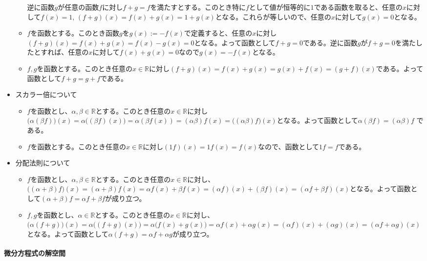 \begin{itemize}
\begin{itemize}
逆に函数$g$が任意の函数$f$に対し$f + g = f$を満たすとする。このとき特に$f$として値が恒等的に$1$である函数を取ると、任意の$x$に対して$f(x) = 1$, $(f + g)(x) = f(x) + g(x) = 1 + g(x)$となる。これらが等しいので、任意の$x$に対して$g(x) = 0$となる。
\item $f$を函数とする。このとき函数$g$を$g(x) := -f(x)$で定義すると、任意の$x$に対し$(f + g)(x) = f(x) + g(x) = f(x) - g(x) =0$となる。よって函数として$f + g = 0$である。逆に函数$g$が$f + g = 0$を満たしたとすれば、任意の$x$に対して$f(x) + g(x) = 0$なので$g(x) = -f(x)$となる。
\item $f, g$を函数とする。このとき任意の$x\in\mathbb{R}$に対し$(f + g)(x) = f(x) + g(x) = g(x) + f(x) = (g + f)(x)$である。よって函数として$f + g = g + f$である。
\end{itemize}
\item スカラー倍について
\begin{itemize}
\item $f$を函数とし、$\alpha,\beta\in\mathbb{R}$とする。このとき任意の$x\in\mathbb{R}$に対し$\bigl(\alpha(\beta f)\bigr)(x) = \alpha\bigl((\beta f)(x)\bigr) = \alpha(\beta f(x)) = (\alpha \beta)f(x) = \bigl((\alpha\beta)f\bigr)(x)$となる。よって函数として$\alpha(\beta f) = (\alpha \beta)f$ である。
\item $f$を函数とする。このとき任意の$x\in\mathbb{R}$に対し$(1f)(x) = 1f(x) = f(x)$なので、函数として$1f = f$である。
\end{itemize}
\item 分配法則について
\begin{itemize}
\item $f$を函数とし、$\alpha, \beta\in\mathbb{R}$とする。このとき任意の$x\in\mathbb{R}$に対し、$\bigl((\alpha + \beta)f\bigr)(x) = (\alpha + \beta)f(x) = \alpha f(x) + \beta f(x) = (\alpha f)(x) + (\beta f)(x) = (\alpha f  + \beta f)(x)$となる。よって函数として$(\alpha + \beta)f = \alpha f + \beta f$が成り立つ。
\item $f, g$を函数とし、$\alpha\in\mathbb{R}$とする。このとき任意の$x\in\mathbb{R}$に対し、$\bigl(\alpha(f + g)\bigr)(x) = \alpha\bigl((f + g)(x)\bigr) = \alpha\bigl(f(x) + g(x)\bigr) = \alpha f(x) + \alpha g(x) = (\alpha f)(x) + (\alpha g)(x) = (\alpha f + \alpha g)(x)$となる。よって函数として$\alpha(f + g) = \alpha f + \alpha g$が成り立つ。
\end{itemize}
\end{itemize}

\paragraph{微分方程式の解空間}

